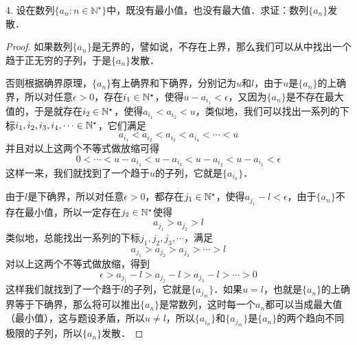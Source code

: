 4. 设在数列$\{ a_n:n\in\mathbb{N}^\star\}$中，既没有最小值，也没有最大值．求证：数列$\{a_n\}$发散．
\begin{proof}
如果数列$\{ a_n \}$是无界的，譬如说，不存在上界，那么我们可以从中找出一个趋于正无穷的子列，于是$\{a_n \}$发散．

否则根据确界原理，$\{a_n\}$有上确界和下确界，分别记为$u$和$l$，由于$u$是$\{ a_n \}$的上确界，所以对任意$\epsilon > 0$，存在$i_1 \in \mathbb{N}^\star$，使得$u - a_{i_1} < \epsilon$，又因为$\{ a_n \}$是不存在最大值的，于是就存在$i_2 \in \mathbb{N}^\star$，使得$a_{i_1} < a_{i_2} < u$，类似地，我们可以找出一系列的下标$i_1, i_2, i_3, i_4, \cdots \in \mathbb{N}^\star$，它们满足
\begin{equation}
    a_{i_1} < a_{i_2} < a_{i_3} < a_{i_4} < \cdots < u
\end{equation}
并且对以上这两个不等式做放缩可得
\begin{equation}
    0 < \cdots < u - a_{i_4} < u - a_{i_3} < u - a_{i_2} < u - a_{i_1} < \epsilon
\end{equation}
这样一来，我们就找到了一个趋于$u$的子列，它就是$\{ a_{i_n} \}$．

由于$l$是下确界，所以对任意$\epsilon > 0$，都存在$j_1 \in \mathbb{N}^\star$，使得$a_{j_1} - l < \epsilon$，由于$\{ a_n \}$不存在最小值，所以一定存在$j_2 \in \mathbb{N}^\star$使得
\begin{equation}
    a_{j_1} > a_{j_2} > l
\end{equation}
类似地，总能找出一系列的下标$j_1, j_2, j_3, \cdots$，满足
\begin{equation}
    a_{j_1} > a_{j_2} > a_{j_3} > \cdots > l
\end{equation}
对以上这两个不等式做放缩，得到
\begin{equation}
    \epsilon > a_{j_1} - l > a_{j_2} - l > a_{j_3} - l > \cdots > 0
\end{equation}
这样我们就找到了一个趋于$l$的子列，它就是$\{ a_{j_m} \}$．如果$u = l$，也就是$\{ a_n \}$的上确界等于下确界，那么将可以推出$\{ a_n \}$是常数列，这时每一个$a_n$都可以当成最大值（最小值），这与题设矛盾，所以$u \neq l$，所以$\{ a_{i_n} \}$和$\{ a_{j_m} \}$是$\{ a_n \}$的两个趋向不同极限的子列，所以$\{ a_n \}$发散．
\end{proof}